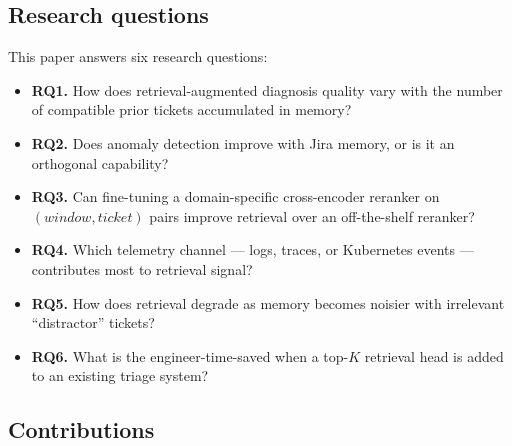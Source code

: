 \subsection{Research questions}

This paper answers six research questions:

\begin{itemize}
    \item \textbf{RQ1.} How does retrieval-augmented diagnosis quality vary with the number of compatible prior tickets accumulated in memory?
    \item \textbf{RQ2.} Does anomaly detection improve with Jira memory, or is it an orthogonal capability?
    \item \textbf{RQ3.} Can fine-tuning a domain-specific cross-encoder reranker on $(\textit{window}, \textit{ticket})$ pairs improve retrieval over an off-the-shelf reranker?
    \item \textbf{RQ4.} Which telemetry channel --- logs, traces, or Kubernetes events --- contributes most to retrieval signal?
    \item \textbf{RQ5.} How does retrieval degrade as memory becomes noisier with irrelevant ``distractor'' tickets?
    \item \textbf{RQ6.} What is the engineer-time-saved when a top-$K$ retrieval head is added to an existing triage system?
\end{itemize}

\subsection{Contributions}

